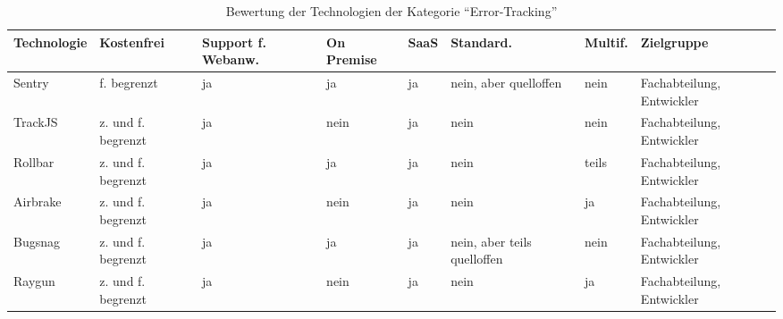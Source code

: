 \begin{table}[H]%
\centering
\addtolength{\leftskip}{-2cm}
\addtolength{\rightskip}{-2cm}
\begin{tabular}{|p{3.05cm}|p{1.8cm}|p{1.7cm}|p{1.2cm}|p{1.3cm}|p{1.7cm}|p{1.3cm}|p{2.6cm}|}
\hline
Technologie & Kostenfrei & Support f. Webanw. & On \mbox{Premise} & SaaS & Standard. & Multif. & Zielgruppe \\
\hline
Sentry & f. begrenzt & ja & ja & ja & nein, aber quelloffen & nein & Fachabteilung, Entwickler \\
\hline
TrackJS & z. und f. begrenzt & ja & nein & ja & nein & nein & Fachabteilung, Entwickler \\
\hline
Rollbar & z. und f. begrenzt & ja & ja & ja & nein & teils & Fachabteilung, Entwickler \\
\hline
Airbrake & z. und f. begrenzt & ja & nein & ja & nein & ja & Fachabteilung, Entwickler \\
\hline
Bugsnag & z. und f. begrenzt & ja & ja & ja & nein, aber teils quelloffen & nein & Fachabteilung, Entwickler \\
\hline
Raygun & z. und f. begrenzt & ja & nein & ja & nein & ja & Fachabteilung, Entwickler \\
\hline
\end{tabular}
\caption{Bewertung der Technologien der Kategorie \enquote{Error-Tracking}}
\label{tab:technologie-bewertung-error-tracking}
\end{table}
